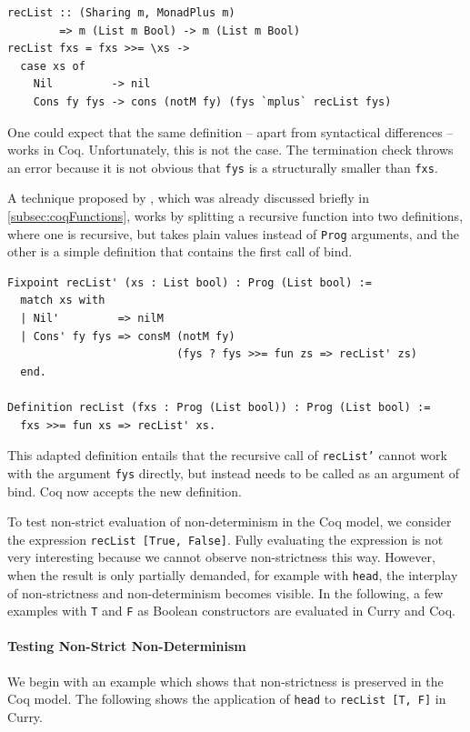 \documentclass[a4paper, 11pt, fleqn, twoside, abstract=on]{scrreprt}
\newcommand{\hinl}[1]{\texttt{#1}}
\newcommand{\cinl}[1]{\texttt{#1}}
\begin{document}
\begin{verbatim}
recList :: (Sharing m, MonadPlus m) 
        => m (List m Bool) -> m (List m Bool)
recList fxs = fxs >>= \xs ->
  case xs of
    Nil         -> nil
    Cons fy fys -> cons (notM fy) (fys `mplus` recList fys)
\end{verbatim}

One could expect that the same definition -- apart from syntactical differences -- works in Coq.
Unfortunately, this is not the case.
The termination check throws an error because it is not obvious that \hinl{fys} is a structurally smaller than \hinl{fxs}.

A technique proposed by \citet{chlipala2013certified}, which was already discussed briefly in \autoref{subsec:coqFunctions}, works by splitting a recursive function into two definitions, where one is recursive, but takes plain values instead of \cinl{Prog} arguments, and the other is a simple definition that contains the first call of bind.

\begin{verbatim}
Fixpoint recList' (xs : List bool) : Prog (List bool) :=
  match xs with
  | Nil'         => nilM
  | Cons' fy fys => consM (notM fy)
                          (fys ? fys >>= fun zs => recList' zs)
  end.

Definition recList (fxs : Prog (List bool)) : Prog (List bool) :=
  fxs >>= fun xs => recList' xs.
\end{verbatim}

This adapted definition entails that the recursive call of \hinl{recList'} cannot work with the argument \cinl{fys} directly, but instead needs to be called as an argument of bind.
Coq  now accepts the new definition.

To test non-strict evaluation of non-determinism in the Coq model, we consider the expression \hinl{recList [True, False]}.
Fully evaluating the expression is not very interesting because we cannot observe non-strictness this way.
However, when the result is only partially demanded, for example with \cinl{head}, the interplay of non-strictness and non-determinism becomes visible.
In the following, a few examples with \hinl{T} and \hinl{F} as Boolean constructors are evaluated in Curry and Coq.

\paragraph{Testing Non-Strict Non-Determinism}
We begin with an example which shows that non-strictness is preserved in the Coq model.
The following shows the application of \cinl{head} to \cinl{recList [T, F]} in Curry.
\end{document}
